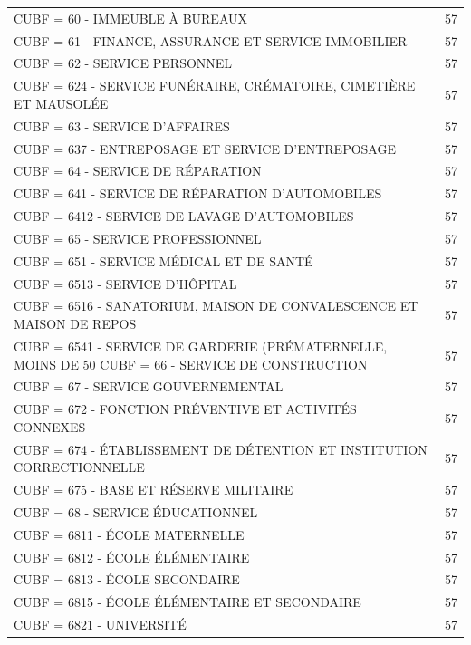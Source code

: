 {\begin{longtable}{p{13cm}r}
                CUBF = 60 - IMMEUBLE À BUREAUX & 57 \\
                CUBF = 61 - FINANCE, ASSURANCE ET SERVICE IMMOBILIER & 57 \\
                CUBF = 62 - SERVICE PERSONNEL & 57 \\
                CUBF = 624 - SERVICE FUNÉRAIRE, CRÉMATOIRE, CIMETIÈRE ET MAUSOLÉE & 57 \\
                CUBF = 63 - SERVICE D'AFFAIRES & 57 \\
                CUBF = 637 - ENTREPOSAGE ET SERVICE D'ENTREPOSAGE & 57 \\
                CUBF = 64 - SERVICE DE RÉPARATION & 57 \\
                CUBF = 641 - SERVICE DE RÉPARATION D'AUTOMOBILES & 57 \\
                CUBF = 6412 - SERVICE DE LAVAGE D'AUTOMOBILES & 57 \\
                CUBF = 65 - SERVICE PROFESSIONNEL & 57 \\
                CUBF = 651 - SERVICE MÉDICAL ET DE SANTÉ & 57 \\
                CUBF = 6513 - SERVICE D'HÔPITAL & 57 \\
                CUBF = 6516 - SANATORIUM, MAISON DE CONVALESCENCE ET MAISON DE REPOS & 57 \\
                CUBF = 6541 - SERVICE DE GARDERIE (PRÉMATERNELLE, MOINS DE 50 %
                CUBF = 66 - SERVICE DE CONSTRUCTION & 57 \\
                CUBF = 67 - SERVICE GOUVERNEMENTAL & 57 \\
                CUBF = 672 - FONCTION PRÉVENTIVE ET ACTIVITÉS CONNEXES & 57 \\
                CUBF = 674 - ÉTABLISSEMENT DE DÉTENTION ET INSTITUTION CORRECTIONNELLE & 57 \\
                CUBF = 675 - BASE ET RÉSERVE MILITAIRE & 57 \\
                CUBF = 68 - SERVICE ÉDUCATIONNEL & 57 \\
                CUBF = 6811 - ÉCOLE MATERNELLE & 57 \\
                CUBF = 6812 - ÉCOLE ÉLÉMENTAIRE & 57 \\
                CUBF = 6813 - ÉCOLE SECONDAIRE & 57 \\
                CUBF = 6815 - ÉCOLE ÉLÉMENTAIRE ET SECONDAIRE & 57 \\
                CUBF = 6821 - UNIVERSITÉ & 57 \\

\end{longtable}}
